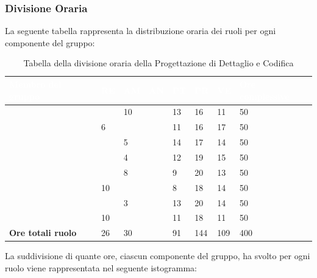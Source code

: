 \subsubsection{Divisione Oraria}
La seguente tabella rappresenta la distribuzione oraria dei ruoli per ogni componente del gruppo:
{
	\renewcommand{\arraystretch}{2}


	
\begin{longtable}[h]{ C{5cm} C{1cm} C{1cm} C{1cm} C{1cm} C{1cm} C{1cm} C{3cm}}
	\caption{Tabella della divisione oraria della Progettazione di Dettaglio e Codifica}\\
	\textcolor{white}{\textbf{Membro del gruppo}} & 
	\textcolor{white}{\textbf{RE}} & 
	\textcolor{white}{\textbf{AM}} & 
	\textcolor{white}{\textbf{AN}} & 
	\textcolor{white}{\textbf{PT}} & 
	\textcolor{white}{\textbf{PR}} & 
	\textcolor{white}{\textbf{VE}} & 
	\textcolor{white}{\textbf{Ore complessive}}\\
\endhead	
        
        \MC{} & & 10 & & 13 & 16 & 11 & 50\\
        \LD{} & 6 & & & 11 & 16 & 17 & 50\\
        \CE{} & & 5 & & 14 & 17 & 14 & 50 \\
        \SE{} & & 4 & & 12 & 19 & 15 & 50\\
        \PF{} & & 8 & & 9 & 20 & 13 & 50\\
        \DF{} & 10 & & & 8 & 18 & 14 & 50\\
        \BR{} & & 3 & & 13 & 20 & 14 & 50\\
       \AT{} & 10 & & & 11 & 18 & 11 & 50 \\
        \textbf{Ore totali ruolo} & 26 & 30 & & 91 & 144 & 109 & 400\\
		
	\end{longtable}

}

La suddivisione di quante ore, ciascun componente del gruppo, ha svolto per ogni ruolo viene rappresentata nel seguente istogramma:



